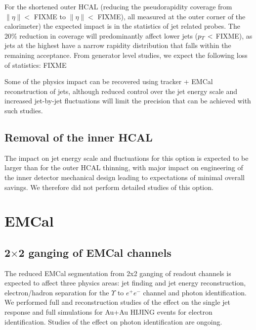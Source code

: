 For the shortened outer HCAL (reducing the pseudorapidity coverage from $\| \eta \| <$ FIXME to $\| \eta \| < $ FIXME), all measured
at the outer corner of the calorimeter) the expected impact 
is in the statistics of jet related probes. The 20\% reduction in coverage will predominantly affect lower \pt jets ($\mbox{${p_T}$} <$ FIXME),
as jets at the highest \pT have a narrow rapidity distribution that falls within the remaining acceptance. From generator level 
studies, we expect the following loss of statistics: FIXME

Some of the physics impact can be recovered using tracker + EMCal reconstruction of jets, although reduced control over the jet 
energy scale and increased jet-by-jet fluctuations will limit the precision that can be achieved with such studies.

\subsection{Removal of the inner HCAL}

The impact on jet energy scale and fluctuations for this option is expected to be larger than for the outer HCAL thinning, 
with major impact on engineering of the inner detector mechanical design leading to expectations of minimal overall savings.
We therefore did not perform detailed studies of this option.

\section{EMCal}
\subsection{2$\times$2 ganging of EMCal channels}
The reduced EMCal segmentation from 2x2 ganging of readout channels is expected to affect three physics areas: jet finding 
and jet energy reconstruction, electron/hadron separation for the $\Upsilon$ to $e^+ e^-$ channel and photon identification.
We performed full \geant and reconstruction studies of the effect on the single jet response and full \geant simulations for 
Au+Au HIJING events for electron identification. Studies of the effect on photon identification are ongoing.

